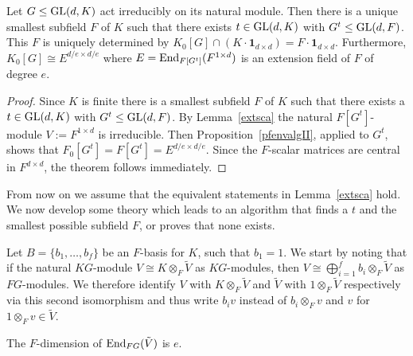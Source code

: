 \begin{Theo}
\label{charsmallest}
Let $G \leq \GL(d, K)$ act
irreducibly on its natural module. Then there is a
unique smallest subfield $F$ of $K$ such that there exists $t \in
\GL(d,K)$ with $G^t \le \GL(d,F)$. This $F$ is uniquely determined by 
$K_0[G] \cap (K \cdot \mathbf{1}_{d \times d}) 
= F \cdot \mathbf{1}_{d \times d}$. Furthermore,   $K_0[G] \cong E^{d/e
\times d/e}$ where $E = \End_{F[G^t]}(F^{1 \times d})$ is an 
extension field of $F$ of degree $e$.
\end{Theo}
\begin{proof}
Since $K$ is finite there is a smallest subfield $F$ of
$K$ such that there exists a $t \in \GL(d,K)$ with $G^t \le \GL(d,F)$.
By Lemma~\ref{extsca} the natural $F[G^t]$-module $V := F^{1 \times d}$ is
irreducible.
Then Proposition~\ref{pfenvalgII},  applied to $G^t$,
shows that $F_0[G^t] = F[G^t] = E^{d/e \times d/e}$.
Since the
$F$-scalar matrices are central in $F^{d \times d}$, the theorem
follows immediately.
\end{proof}


{} From now on we assume that the equivalent statements in Lemma~\ref{extsca}
hold. We now develop some theory which leads to 
an algorithm that finds a $t$ and the smallest possible subfield $F$, or proves
that none exists.

Let $B = \{b_1, \ldots, b_f\}$ be an $F$-basis for $K$, such that $b_1 = 1$.
We start by noting that if the natural $KG$-module
$V \cong K \otimes_F \tilde{V}$ as $KG$-modules, then
$V \cong \bigoplus_{i = 1}^f b_i \otimes_F \tilde{V}$ as $FG$-modules.
We therefore identify $V$ 
with $K \otimes_F \tilde{V}$ and $\tilde{V}$
with $1 \otimes_F \tilde{V}$ respectively via this second
isomorphism and thus write $b_i v$ instead of $b_i \otimes_F v$ and $v$ for
$1 \otimes_F v \in \tilde{V}$. 

\begin{Lemm} 
\label{degsplittingfield}
The $F$-dimension of\/ $\End_{FG}(\tilde{V})$ is  $e$.
\end{Lemm}

